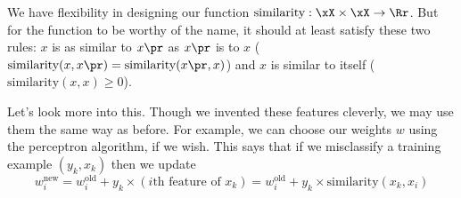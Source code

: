 

  We have flexibility in designing our function
  $\text{similarity}:\xX\times\xX\to\Rr$.  But for the function to be worthy
  of the name, it should at least satisfy these two rules:
  $x$ is as similar to $x\pr$ as $x\pr$ is to $x$
  ($\text{similarity}(x,x\pr) = \text{similarity}(x\pr,x)$)
  and $x$ is similar to itself
  ($\text{similarity}(x,x) \geq 0$).

  Let's look more into this.
  Though we invented these features cleverly, we may use them the same
  way as before.  For example, we can choose our weights $w$ using the
  perceptron algorithm, if we wish.  This says that if we misclassify a training
  example $(y_k, x_k)$ then we update
  $$
    w_i^{\text{new}}
    = w_i^{\text{old}} + y_k \times (\text{$i$th feature of $x_k$})
    = w_i^{\text{old}} + y_k \times \text{similarity}(x_k, x_i)
  $$


